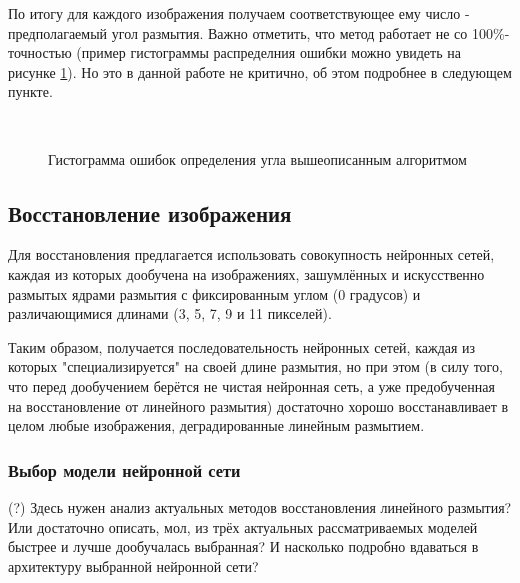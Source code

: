 По итогу для каждого изображения получаем соответствующее ему число - предполагаемый угол размытия. Важно отметить, что метод работает не со 100\%-точностью (пример гистограммы распределния ошибки можно увидеть на рисунке \ref{ris:angle_histogram}). Но это в данной работе не критично, об этом подробнее в следующем пункте.

\begin{figure}[H]
 \\ 
\caption{Гистограмма ошибок определения угла вышеописанным алгоритмом}
\label{ris:angle_histogram}
\end{figure}

\newpage
\subsection{Восстановление изображения}
Для восстановления предлагается использовать совокупность нейронных сетей, каждая из которых дообучена на изображениях, зашумлённых и искусственно размытых ядрами размытия с фиксированным углом (0 градусов)
и различающимися длинами (3, 5, 7, 9 и 11 пикселей).

Таким образом, получается последовательность нейронных сетей, каждая из которых "специализируется" на своей длине размытия, но при этом (в силу того, что перед дообучением берётся не чистая нейронная сеть, а уже предобученная на восстановление от линейного размытия) достаточно хорошо восстанавливает в целом любые изображения, деградированные линейным размытием. 

\subsubsection{Выбор модели нейронной сети}
 (?) Здесь нужен анализ актуальных методов восстановления линейного размытия?
Или достаточно описать, мол, из трёх актуальных рассматриваемых моделей быстрее и лучше дообучалась выбранная? И насколько подробно вдаваться в архитектуру выбранной нейронной сети?

